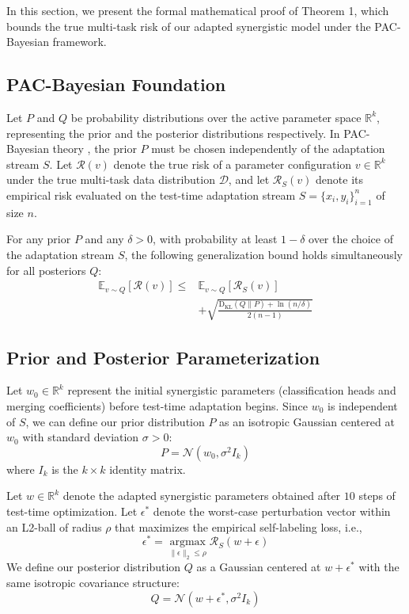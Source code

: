 \documentclass{article}
\begin{document}
In this section, we present the formal mathematical proof of Theorem 1, which bounds the true multi-task risk of our adapted synergistic model under the PAC-Bayesian framework.

\subsection{PAC-Bayesian Foundation}
Let $P$ and $Q$ be probability distributions over the active parameter space $\mathbb{R}^k$, representing the prior and the posterior distributions respectively. In PAC-Bayesian theory \cite{mcallester1999pac}, the prior $P$ must be chosen independently of the adaptation stream $S$. Let $\mathcal{R}(v)$ denote the true risk of a parameter configuration $v \in \mathbb{R}^k$ under the true multi-task data distribution $\mathcal{D}$, and let $\mathcal{R}_S(v)$ denote its empirical risk evaluated on the test-time adaptation stream $S = \{x_i, y_i\}_{i=1}^n$ of size $n$. 

For any prior $P$ and any $\delta > 0$, with probability at least $1 - \delta$ over the choice of the adaptation stream $S$, the following generalization bound holds simultaneously for all posteriors $Q$:
\begin{align}
    \mathbb{E}_{v \sim Q}[\mathcal{R}(v)] \le &\mathbb{E}_{v \sim Q}[\mathcal{R}_S(v)] \nonumber \\
    &+ \sqrt{\frac{\text{D}_{\text{KL}}(Q \parallel P) + \ln(n/\delta)}{2(n-1)}}
\label{eq:pac_base}
\end{align}

\subsection{Prior and Posterior Parameterization}
Let $w_0 \in \mathbb{R}^k$ represent the initial synergistic parameters (classification heads and merging coefficients) before test-time adaptation begins. Since $w_0$ is independent of $S$, we can define our prior distribution $P$ as an isotropic Gaussian centered at $w_0$ with standard deviation $\sigma > 0$:
\begin{equation}
    P = \mathcal{N}\left( w_0, \sigma^2 I_k \right)
\end{equation}
where $I_k$ is the $k \times k$ identity matrix.

Let $w \in \mathbb{R}^k$ denote the adapted synergistic parameters obtained after $10$ steps of test-time optimization. Let $\epsilon^*$ denote the worst-case perturbation vector within an L2-ball of radius $\rho$ that maximizes the empirical self-labeling loss, i.e.,
\begin{equation}
    \epsilon^* = \operatorname*{argmax}_{\|\epsilon\|_2 \le \rho} \mathcal{R}_S(w + \epsilon)
\end{equation}
We define our posterior distribution $Q$ as a Gaussian centered at $w + \epsilon^*$ with the same isotropic covariance structure:
\begin{equation}
    Q = \mathcal{N}\left( w + \epsilon^*, \sigma^2 I_k \right)
\end{equation}
\end{document}
